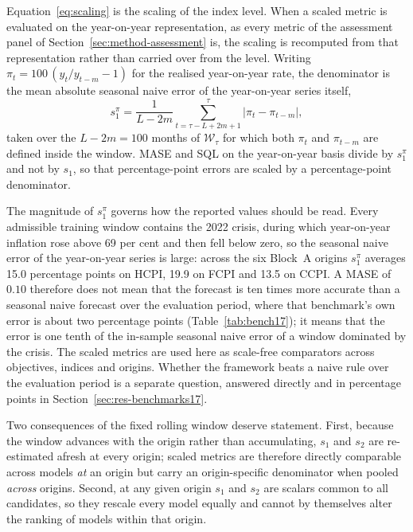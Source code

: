 \documentclass[12pt]{article}
\begin{document}
Equation~\eqref{eq:scaling} is the scaling of the index level. When a scaled
metric is evaluated on the year-on-year representation, as every metric of the
assessment panel of Section~\ref{sec:method-assessment} is, the scaling is
recomputed from that representation rather than carried over from the level.
Writing $\pi_t = 100\,(y_t / y_{t-m} - 1)$ for the realised year-on-year rate,
the denominator is the mean absolute seasonal naive error of the year-on-year
series itself,
\begin{equation}
    s_1^{\pi} = \frac{1}{L-2m} \sum_{t=\tau-L+2m+1}^{\tau}
                 \big| \pi_t - \pi_{t-m} \big| ,
    \label{eq:scaling-yoy}
\end{equation}
taken over the $L - 2m = 100$ months of $\mathcal{W}_\tau$ for which both
$\pi_t$ and $\pi_{t-m}$ are defined inside the window. MASE and SQL on the
year-on-year basis divide by $s_1^{\pi}$ and not by $s_1$, so that
percentage-point errors are scaled by a percentage-point denominator.

The magnitude of $s_1^{\pi}$ governs how the reported values should be read.
Every admissible training window contains the 2022 crisis, during which
year-on-year inflation rose above 69 per cent and then fell below zero, so the
seasonal naive error of the year-on-year series is large: across the six
Block~A origins $s_1^{\pi}$ averages 15.0 percentage points on HCPI, 19.9 on
FCPI and 13.5 on CCPI. A MASE of $0.10$ therefore does not mean that the
forecast is ten times more accurate than a seasonal naive forecast over the
evaluation period, where that benchmark's own error is about two percentage
points (Table~\ref{tab:bench17}); it means that the error is one tenth of the
in-sample seasonal naive error of a window dominated by the crisis. The scaled
metrics are used here as scale-free comparators across objectives, indices and
origins. Whether the framework beats a naive rule over the evaluation period is
a separate question, answered directly and in percentage points in
Section~\ref{sec:res-benchmarks17}.

Two consequences of the fixed rolling window deserve statement. First, because
the window advances with the origin rather than accumulating, $s_1$ and $s_2$ are
re-estimated afresh at every origin; scaled metrics are therefore directly
comparable across models \emph{at} an origin but carry an origin-specific
denominator when pooled \emph{across} origins. Second, at any given origin $s_1$
and $s_2$ are scalars common to all candidates, so they rescale every model
equally and cannot by themselves alter the ranking of models within that origin.
\end{document}
